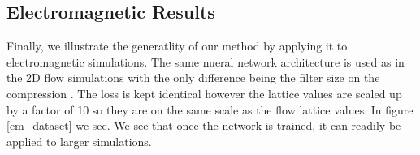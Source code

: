 \documentclass{article}
\begin{document}
\subsection{Electromagnetic Results}

Finally, we illustrate the generatlity of our method by applying it to electromagnetic simulations. The same nueral network architecture is used as in the 2D flow simulations with the only difference being the filter size on the compression . The loss is kept identical however the lattice values are scaled up by a factor of 10 so they are on the same scale as the flow lattice values. In figure \ref{em_dataset} we see. We see that once the network is trained, it can readily be applied to larger simulations.

\begin{figure}[!t]
\centering
{}

\end{figure}
\end{document}
